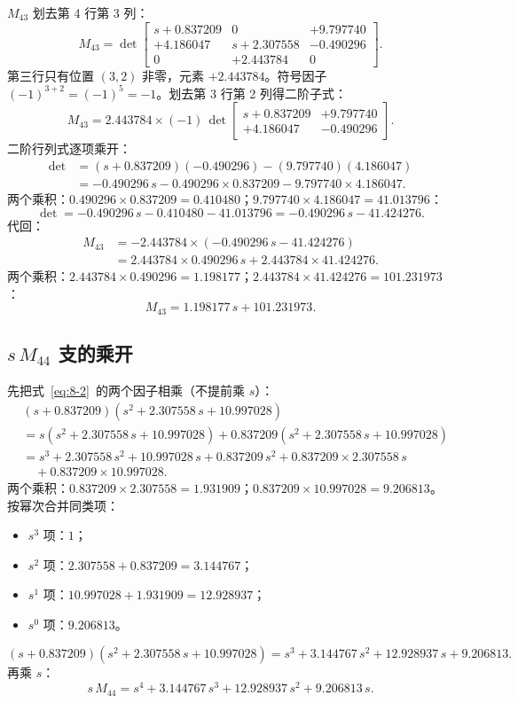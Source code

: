 \documentclass[11pt,a4paper]{ctexart}
\begin{document}
$M_{43}$ 划去第 4 行第 3 列：
\[
M_{43} = \det
\begin{bmatrix}
s+0.837209 & 0 & +9.797740 \\
+4.186047 & s+2.307558 & -0.490296 \\
0 & +2.443784 & 0
\end{bmatrix}.
\]
第三行只有位置 $(3,2)$ 非零，元素 $+2.443784$。符号因子 $(-1)^{3+2}=(-1)^{5}=-1$。划去第 3 行第 2 列得二阶子式：
\[
M_{43} = 2.443784\times(-1)\,
\det\begin{bmatrix} s+0.837209 & +9.797740 \\ +4.186047 & -0.490296 \end{bmatrix}.
\]
二阶行列式逐项乘开：
\begin{align*}
\det &= (s+0.837209)(-0.490296) - (9.797740)(4.186047)\\
&= -0.490296\,s - 0.490296\times 0.837209 - 9.797740\times 4.186047.
\end{align*}
两个乘积：$0.490296\times 0.837209 = 0.410480$；$9.797740\times 4.186047 = 41.013796$：
\[
\det = -0.490296\,s - 0.410480 - 41.013796 = -0.490296\,s - 41.424276.
\]
代回：
\begin{align*}
M_{43} &= -2.443784\times\left(-0.490296\,s - 41.424276\right)\\
&= 2.443784\times 0.490296\,s + 2.443784\times 41.424276.
\end{align*}
两个乘积：$2.443784\times 0.490296 = 1.198177$；$2.443784\times 41.424276 = 101.231973$：
\begin{equation}\label{eq:8-3}
M_{43} = 1.198177\,s + 101.231973.
\tag{(8-3)}
\end{equation}

\subsection{\texorpdfstring{$s\,M_{44}$}{sM44} 支的乘开}

先把式~\eqref{eq:8-2}~的两个因子相乘（不提前乘 $s$）：
\begin{align*}
&(s+0.837209)\left(s^2+2.307558\,s+10.997028\right)\\
&= s\left(s^2+2.307558\,s+10.997028\right)
+ 0.837209\left(s^2+2.307558\,s+10.997028\right)\\
&= s^3 + 2.307558\,s^2 + 10.997028\,s
+ 0.837209\,s^2 + 0.837209\times 2.307558\,s\\
&\quad + 0.837209\times 10.997028.
\end{align*}
两个乘积：$0.837209\times 2.307558 = 1.931909$；$0.837209\times 10.997028 = 9.206813$。按幂次合并同类项：
\begin{itemize}[itemsep=1pt]
  \item $s^3$ 项：$1$；
  \item $s^2$ 项：$2.307558+0.837209 = 3.144767$；
  \item $s^1$ 项：$10.997028+1.931909 = 12.928937$；
  \item $s^0$ 项：$9.206813$。
\end{itemize}
\[
(s+0.837209)\left(s^2+2.307558\,s+10.997028\right)
= s^3 + 3.144767\,s^2 + 12.928937\,s + 9.206813.
\]
再乘 $s$：
\[
s\,M_{44} = s^4 + 3.144767\,s^3 + 12.928937\,s^2 + 9.206813\,s.
\]
\end{document}
